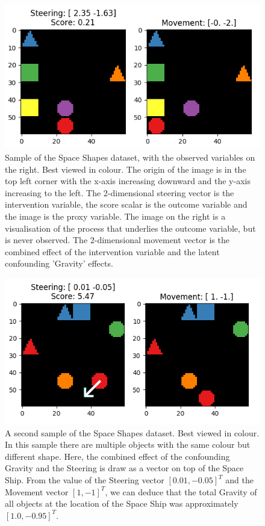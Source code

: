 \documentclass{report}
\begin{document}
\begin{figure}
    \centering
    \includegraphics{latex/Images/sample_space_shapes_score_left.png}
    \caption{Sample of the Space Shapes dataset, with the observed variables on the right. Best viewed in colour. The origin of the image is in the top left corner with the x-axis increasing downward and the y-axis increasing to the left. The 2-dimensional steering vector is the intervention variable, the score scalar is the outcome variable and the image is the proxy variable. The image on the right is a visualisation of the process that underlies the outcome variable, but is never observed. The 2-dimensional movement vector is the combined effect of the intervention variable and the latent confounding 'Gravity' effects.}
    \label{fig:space_shapes_sample}
\end{figure}
\begin{figure}
    \centering
    \includegraphics{latex/Images/second_example_space_shapes.png}
    \caption{A second sample of the Space Shapes dataset. Best viewed in colour. In this sample there are multiple objects with the same colour but different shape. Here, the combined effect of the confounding Gravity and the Steering is draw as a vector on top of the Space Ship. From the value of the Steering vector $[0.01, -0.05]^T$ and the Movement vector $[1, -1]^T$, we can deduce that the total Gravity of all objects at the location of the Space Ship was approximately $[1.0, -0.95]^T$.}
    \label{fig:space_shapes_sample_with_arrow}
\end{figure}
\end{document}
